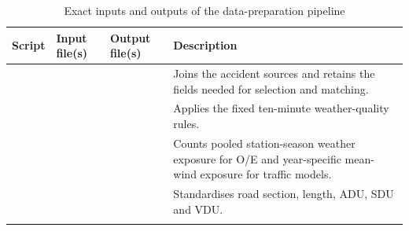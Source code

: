 \begin{table}[p]

\centering
\tiny
\setlength{\tabcolsep}{2.5pt}
\renewcommand{\arraystretch}{1.08}
\caption{Exact inputs and outputs of the data-preparation pipeline}
\label{tab:pipeline}
\begin{tabularx}{\textwidth}{L{0.18\textwidth}!{\color{gray!45}\vrule width 0.3pt}L{0.27\textwidth}!{\color{gray!45}\vrule width 0.3pt}L{0.29\textwidth}!{\color{gray!45}\vrule width 0.3pt}X}
\toprule
Script & Input file(s) & Output file(s) & Description \\
\midrule
{} &
\emph{}\newline {}\newline {}\newline {}\newline {} &
\emph{}\newline {} &
Joins the accident sources and retains the fields needed for selection and matching. \\ \grayhline
{} &
\emph{}\newline {} &
\emph{}\newline {} &
Applies the fixed ten-minute weather-quality rules. \\ \grayhline
{} &
\emph{}\newline {} &
\emph{}\newline {}\newline {} &
Counts pooled station-season weather exposure for O/E and year-specific mean-wind exposure for traffic models. \\ \grayhline
{} &
\emph{}\newline {} &
\emph{}\newline {} &
Standardises road section, length, ADU, SDU and VDU. \\ \grayhline
{} &
\emph{}\newline {}\newline \emph{}\newline {}\newline \emph{}\newline {} &

\end{tabularx}
\end{table}
